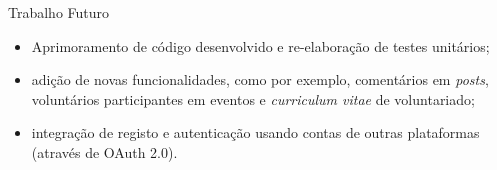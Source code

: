 \begin{frame}{Trabalho Futuro}
	
\vspace*{-3em}
	
\begin{itemize}
	\item Aprimoramento de código desenvolvido e re-elaboração de testes unitários;
	\item adição de novas funcionalidades, como por exemplo, comentários em \textit{posts}, voluntários participantes em eventos e \textit{curriculum vitae} de voluntariado;
	\item integração de registo e autenticação usando contas de outras plataformas (através de OAuth 2.0).
\end{itemize}

\end{frame}